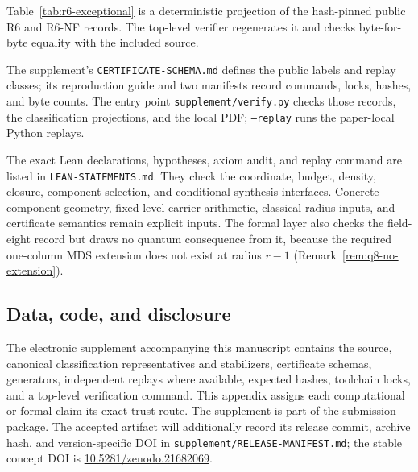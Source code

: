 Table~\ref{tab:r6-exceptional} is a deterministic projection of the
hash-pinned public R6 and R6-NF records.  The top-level verifier
regenerates it and checks byte-for-byte equality with the included
source.

The supplement's \texttt{CERTIFICATE-SCHEMA.md} defines the public labels and
replay classes; its reproduction guide and two manifests record commands,
locks, hashes, and byte counts. The entry point \texttt{supplement/verify.py}
checks those records, the classification projections, and the local PDF;
\texttt{--replay} runs the paper-local Python replays.

The exact Lean declarations, hypotheses, axiom audit, and replay command are
listed in \texttt{LEAN-STATEMENTS.md}. They check the coordinate,
budget, density, closure, component-selection, and conditional-synthesis
interfaces. Concrete component geometry, fixed-level carrier arithmetic,
classical radius inputs, and certificate semantics remain explicit inputs.
The formal layer also checks the field-eight record but draws no quantum
consequence from it, because the required one-column MDS extension does not
exist at radius \(r-1\) (Remark~\ref{rem:q8-no-extension}).

\subsection{Data, code, and disclosure}\label{sec:provenance}

The electronic supplement accompanying this manuscript contains the
source, canonical classification representatives and stabilizers,
certificate schemas, generators, independent replays where available,
expected hashes, toolchain locks, and a top-level verification command.
This appendix assigns each computational or formal claim its exact trust
route.  The supplement is part of the submission package.  The accepted
artifact will additionally record its release commit, archive hash, and
version-specific DOI in \texttt{supplement/RELEASE-MANIFEST.md}; the stable
concept DOI is \href{https://doi.org/10.5281/zenodo.21682069}%
{10.5281/zenodo.21682069}.

